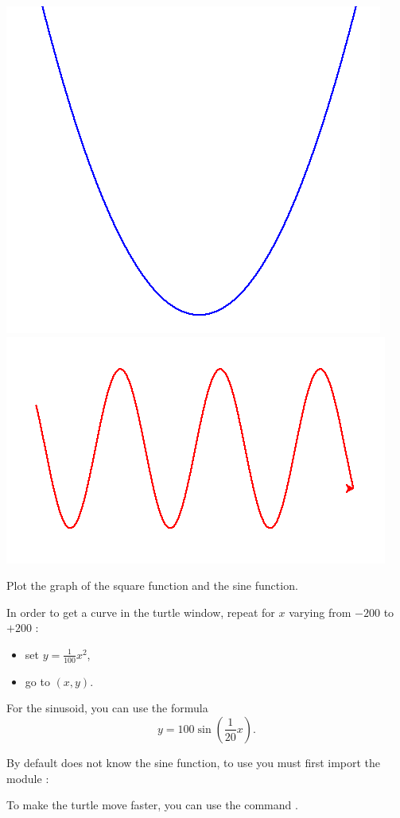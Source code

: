 \documentclass[11pt,class=report,crop=false]{standalone}
\begin{document}

\begin{activite}


\begin{center}
\includegraphics[scale=\myscale,scale=0.4]{screen-turtle-3a}
\includegraphics[scale=\myscale,scale=0.4]{screen-turtle-3b}
\end{center}

Plot the graph of the square function and the sine function.

In order to get a curve in the turtle window, repeat for $x$ varying from $-200$ to $+200$ :
\begin{itemize}
  \item set $y = \frac{1}{100} x^2$,
  \item go to $(x,y)$.
\end{itemize}

For the sinusoid, you can use the formula 
$$y = 100\sin\left(\frac{1}{20}x\right).$$
  
By default \Python{} does not know the sine function, to use  you must first import the module :

To make the turtle move faster, you can use the command .
\end{activite}
\end{document}
